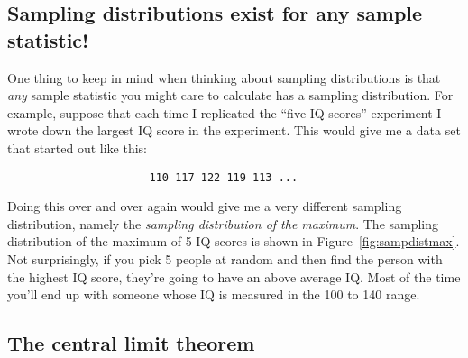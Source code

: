 \subsection{Sampling distributions exist for any sample statistic!}

One thing to keep in mind when thinking about sampling distributions is that {\it any} sample statistic you might care to calculate has a sampling distribution. For example, suppose that each time I replicated the ``five IQ scores'' experiment I wrote down the largest IQ score in the experiment. This would give me a data set that started out like this:
\begin{verbatim}
                      110 117 122 119 113 ... 
\end{verbatim}
Doing this over and over again would give me a very different sampling distribution, namely the {\it sampling distribution of the maximum}. The sampling distribution of the maximum of 5 IQ scores is shown in Figure~\ref{fig:sampdistmax}. Not surprisingly, if you pick 5 people at random and then find the person with the highest IQ score, they're going to have an above average IQ. Most of the time you'll end up with someone whose IQ is measured in the 100 to 140 range. 

\subsection{The central limit theorem~\label{sec:clt}}

